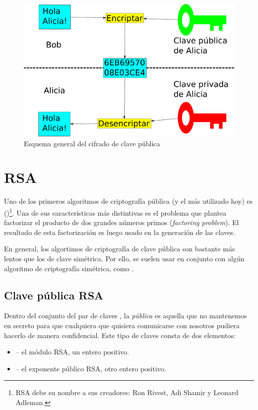 \begin{figure}[ht]
   \centering
   \includegraphics[scale=0.3]{Figures/PublicKeyEncryption}
   \decoRule
   \caption[Cifrado de clave pública (Esquema)]{Esquema general del cifrado de clave pública}
   \label{fig:PublicKeyEncryption}
 \end{figure}


 \section{RSA}

 Uno de los primeros algoritmos de criptografía pública (y el más utilizado hoy) es  ()\footnote{RSA debe su nombre a sus creadores: Ron Rivest, Adi Shamir y Leonard Adleman.}.
 Una de sus características más distintivas es el problema que plantea factorizar el producto de dos grandes números primos (\emph{factoring problem}).
 El resultado de esta factorización es luego usado en la generación de las claves.

 En general, los algortimos de criptografía de clave pública son bastante más lentos que los de clave simétrica.
 Por ello, se suelen usar en conjunto con algún algoritmo de criptografía simétrica, como . \emph{\parencite{Reference9}}

 \subsection{Clave pública RSA}

 Dentro del conjunto del par de claves , la \emph{pública} es aquella que no mantenemos en secreto para que cualquiera que quisiera comunicarse con nosotros pudiera hacerlo de manera confidencial.
 Este tipo de claves consta de dos elementos:
 \begin{itemize}
 \item {} -- el módulo RSA, un entero positivo.
 \item {} -- el exponente público RSA, otro entero positivo.
 \end{itemize}

